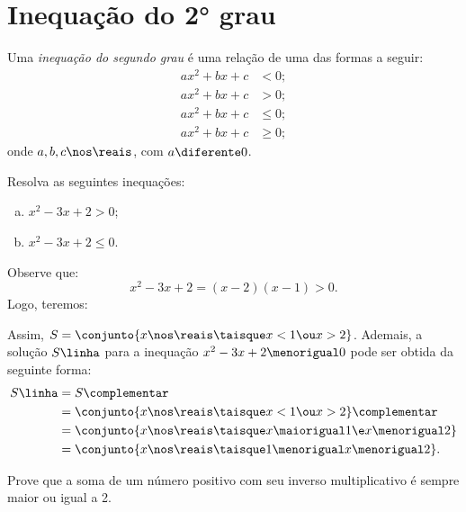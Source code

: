 \section{Inequação do 2° grau}

\begin{definition}
    Uma \emph{inequação do segundo grau} é uma relação de uma das formas
    a seguir:
    \begin{align*}
        ax^2 + bx + c &< 0;   \\
        ax^2 + bx + c &> 0;   \\
        ax^2 + bx + c &\le 0; \\
        ax^2 + bx + c &\ge 0;
    \end{align*}
    onde $a, b, c \nos \reais$, com $a \diferente 0$.
\end{definition}

\begin{example}
    Resolva as seguintes inequações:
    \begin{enumerate}[a)]
        \item $x^2 -3x +2 > 0$;
        \item $x^2 -3x +2 \le 0$.
    \end{enumerate}
\end{example}

\begin{solution}
    Observe que: 
    \[
        x^2 - 3x + 2 = (x-2)(x-1) > 0.
    \]
    Logo, teremos:
    \begin{figure}[H]
        \centering
        \caption{}
    \end{figure}

    Assim, $S = \conjunto{ x \nos \reais \taisque x < 1 \ou x > 2 }$. Ademais, a solução $S\linha$ para a inequação $x^2 - 3x + 2 \menorigual 0$ pode ser obtida da seguinte forma:
    \begin{align*}
        S\linha &= S\complementar \\ 
                &= \conjunto{ x \nos \reais \taisque x < 1 \ou x > 2 }\complementar \\ 
                &= \conjunto{ x \nos \reais \taisque x \maiorigual 1 \e x \menorigual 2 } \\ 
                &= \conjunto{ x \nos \reais \taisque 1 \menorigual x \menorigual 2 }.
    \end{align*}
\end{solution}

\begin{example}
    Prove que a soma de um número positivo com seu inverso multiplicativo é sempre maior ou igual a 2.
\end{example}

